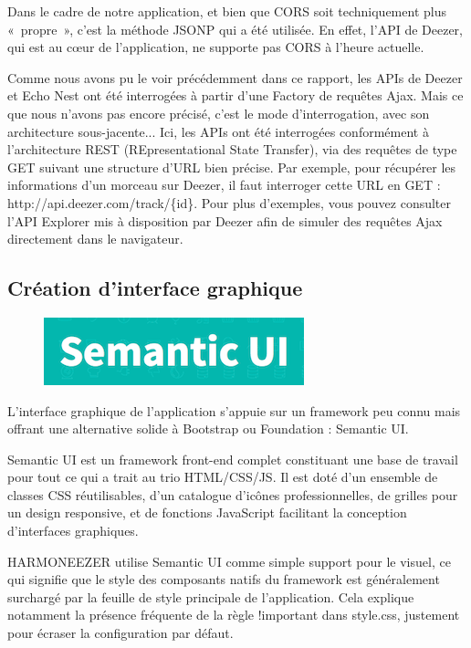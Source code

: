 \documentclass[a4paper,12pt]{article}
\begin{document}
Dans le cadre de notre application, et bien que CORS soit techniquement plus «~propre~», c'est la méthode JSONP qui a été utilisée. En effet, l'API de Deezer, qui est au cœur de l'application, ne supporte pas CORS à l'heure actuelle.

Comme nous avons pu le voir précédemment dans ce rapport, les APIs de Deezer et Echo Nest ont été interrogées à partir d'une Factory de requêtes Ajax. Mais ce que nous n'avons pas encore précisé, c'est le mode d'interrogation, avec son architecture sous-jacente... Ici, les APIs ont été interrogées conformément à l'architecture REST (REpresentational State Transfer), via des requêtes de type GET suivant une structure d'URL bien précise. Par exemple, pour récupérer les informations d'un morceau sur Deezer, il faut interroger cette URL en GET : http://api.deezer.com/track/\{id\}. Pour plus d'exemples, vous pouvez consulter l'API Explorer mis à disposition par Deezer afin de simuler des requêtes Ajax directement dans le navigateur.

\subsection{Création d'interface graphique}

\begin{figure}[!h]
  \begin{center}
    \includegraphics[scale=0.5]{logo-semanticui.png}
  \end{center}
\end{figure}

L'interface graphique de l'application s'appuie sur un framework peu connu mais offrant une alternative solide à Bootstrap ou Foundation : Semantic UI.

Semantic UI est un framework front-end complet constituant une base de travail pour tout ce qui a trait au trio HTML/CSS/JS. Il est doté d'un ensemble de classes CSS réutilisables, d'un catalogue d'icônes professionnelles, de grilles pour un design responsive, et de fonctions JavaScript facilitant la conception d'interfaces graphiques.

HARMONEEZER utilise Semantic UI comme simple support pour le visuel, ce qui signifie que le style des composants natifs du framework est généralement surchargé par la feuille de style principale de l'application. Cela explique notamment la présence fréquente de la règle !important dans style.css, justement pour écraser la configuration par défaut.
\end{document}
